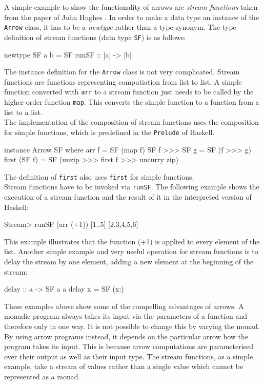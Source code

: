 \documentclass[11pt,a4paper,headsepline, bibtotoc]{scrreprt}
\begin{document}
A simple example to show the functionality of arrows are {\it stream functions} taken from the paper of John Hughes \cite{H:2004}. In order to make a data type an instance of the {\tt Arrow} class, it has to be a \textit{newtype} rather than a type synonym. The type definition of stream functions (data type \texttt{SF}) is as follows:
\begin{code}[caption={Stream Function Definition}]
newtype SF a b = SF {runSF :: [a] -> [b]}
\end{code}
The instance definition for the {\tt Arrow} class is not very complicated. Stream functions are functions representing computiation from list to list. A simple function converted with {\tt arr} to a stream function just needs to be called by the higher-order function {\tt map}. This converts the simple function to a function from a list to a list.\\
The implementation of the composition of stream functions uses the composition for simple functions, which is predefined in the {\tt Prelude} of Haskell.
\begin{code}[caption={SF Arrow Instance}]
instance Arrow SF where
  arr f = SF (map f)
  SF f >>> SF g = SF (f >>> g)
  first (SF f) = SF (unzip >>> first f >>> uncurry zip)
\end{code}
The definition of {\tt first} also uses {\tt first} for simple functions.\\
Stream functions have to be invoked via {\tt runSF}. The following example shows the execution of a stream function and the result of it in the interpreted version of Haskell:
\begin{code}[caption={Sample Call of SF}]
Stream> runSF (arr (+1)) [1..5]
[2,3,4,5,6]
\end{code}
This example illustrates that the function (+1) is applied to every element of the list. Another simple example and very useful operation for stream functions is to delay the stream by one element, adding a new element at the beginning of the stream:
\begin{code}[caption={Delay Function}]
delay :: a -> SF a a
delay x = SF (x:)
\end{code}
These examples above show some of the compelling advantages of arrows. A monadic program always takes its input via the parameters of a function and therefore only in one way. It is not possible to change this by varying the monad. By using arrow programs instead, it depends on the particular arrow how the program takes its input. This is because arrow computations are parameterised over their output as well as their input type. The stream functions, as a simple example, take a stream of values rather than a single value which cannot be represented as a monad.
\end{document}
